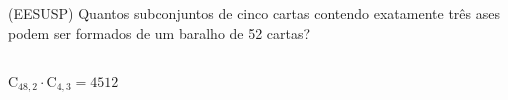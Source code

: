 \begin{ex}
 (EESUSP) Quantos subconjuntos de cinco cartas contendo exatamente  três ases podem ser formados de um baralho de 52 cartas?
   \begin{sol}
     \phantom{A} \\
     $\mathrm{C}_{{48},2}\cdot\mathrm{C}_{4,3}=4512$
   \end{sol}
\end{ex}